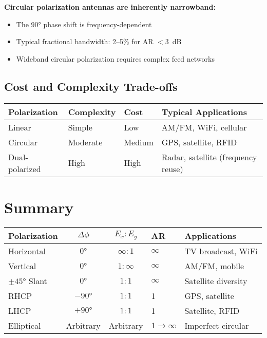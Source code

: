 \begin{center}
\textbf{Circular polarization antennas are inherently narrowband:}
\begin{itemize}
\item The $90°$ phase shift is frequency-dependent
\item Typical fractional bandwidth: 2--5\% for AR $< 3$~dB
\item Wideband circular polarization requires complex feed networks
\end{itemize}

\subsection{Cost and Complexity Trade-offs}

\begin{center}
\begin{tabular}{@{}llll@{}}
\toprule
\textbf{Polarization} & \textbf{Complexity} & \textbf{Cost} & \textbf{Typical Applications} \\
\midrule
Linear & Simple & Low & AM/FM, WiFi, cellular \\
Circular & Moderate & Medium & GPS, satellite, RFID \\
Dual-polarized & High & High & Radar, satellite (frequency reuse) \\
\bottomrule
\end{tabular}
\end{center}

\section{Summary}

\begin{center}
\begin{tabular}{@{}lccll@{}}
\toprule
\textbf{Polarization} & \textbf{$\Delta\phi$} & \textbf{$E_x : E_y$} & \textbf{AR} & \textbf{Applications} \\
\midrule
Horizontal & $0°$ & $\infty : 1$ & $\infty$ & TV broadcast, WiFi \\
Vertical & $0°$ & $1 : \infty$ & $\infty$ & AM/FM, mobile \\
$\pm 45°$ Slant & $0°$ & $1 : 1$ & $\infty$ & Satellite diversity \\
RHCP & $-90°$ & $1 : 1$ & 1 & GPS, satellite \\
LHCP & $+90°$ & $1 : 1$ & 1 & Satellite, RFID \\
Elliptical & Arbitrary & Arbitrary & $1 \to \infty$ & Imperfect circular \\
\bottomrule
\end{tabular}
\end{center}


\end{center}
